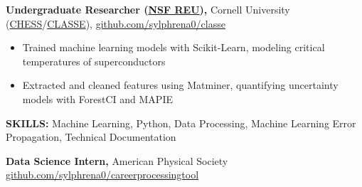 \documentclass[11pt]{article}       %
\begin{document}
\textbf{Undergraduate Researcher (\href{https://new.nsf.gov/funding/initiatives/reu}{NSF REU}),} {Cornell University (\href{https://www.chess.cornell.edu}{CHESS}/\href{https://www.classe.cornell.edu/StudentOpportunities/ProjectList2022.html}{CLASSE}),} \hfill \href{https://github.com/sylphrena0/classe}{github.com/sylphrena0/classe}
\vspace{-9pt}
\begin{itemize}[leftmargin=0.35in]
  \item Trained machine learning models with Scikit-Learn, modeling critical temperatures of superconductors
  \item Extracted and cleaned features using Matminer, quantifying uncertainty models with ForestCI and MAPIE
\end{itemize}
\vspace{-9pt}
\textbf{SKILLS:} Machine Learning, Python, Data Processing, Machine Learning Error Propagation, Technical Documentation
\vspace{9pt}

\textbf{Data Science Intern,} {American Physical Society} \hfill \href{https://github.com/sylphrena0/careerprocessingtool}{github.com/sylphrena0/careerprocessingtool} \\

\vspace{9pt}
\end{document}
